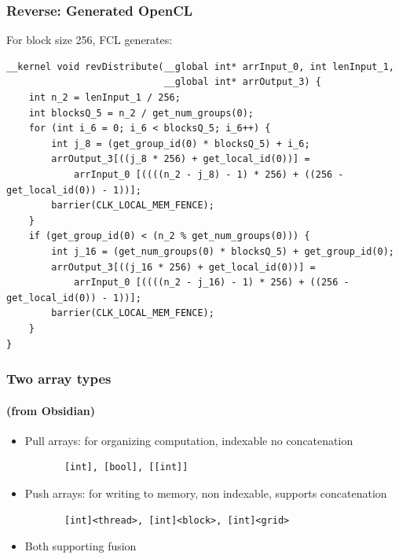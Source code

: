 \documentclass{beamer}
\begin{document}
\begin{frame}[fragile]
\end{frame}

\begin{frame}[fragile]
  \frametitle{Reverse: Generated OpenCL}
For block size 256, FCL generates:

{\tiny
  \begin{verbatim}
__kernel void revDistribute(__global int* arrInput_0, int lenInput_1,
                            __global int* arrOutput_3) {
    int n_2 = lenInput_1 / 256;
    int blocksQ_5 = n_2 / get_num_groups(0);
    for (int i_6 = 0; i_6 < blocksQ_5; i_6++) {
        int j_8 = (get_group_id(0) * blocksQ_5) + i_6;
        arrOutput_3[((j_8 * 256) + get_local_id(0))] = 
            arrInput_0 [((((n_2 - j_8) - 1) * 256) + ((256 - get_local_id(0)) - 1))];
        barrier(CLK_LOCAL_MEM_FENCE);
    }
    if (get_group_id(0) < (n_2 % get_num_groups(0))) {
        int j_16 = (get_num_groups(0) * blocksQ_5) + get_group_id(0);
        arrOutput_3[((j_16 * 256) + get_local_id(0))] = 
            arrInput_0 [((((n_2 - j_16) - 1) * 256) + ((256 - get_local_id(0)) - 1))];
        barrier(CLK_LOCAL_MEM_FENCE);
    }
}
\end{verbatim}
}
\end{frame}

\begin{frame}
  \frametitle{Two array types}
  \framesubtitle{(from Obsidian)}

  \begin{itemize}
  \item Pull arrays: for organizing computation, indexable no concatenation
    \begin{verbatim}
       [int], [bool], [[int]]\end{verbatim}
  \item Push arrays: for writing to memory, non indexable, supports concatenation
    \begin{verbatim}
       [int]<thread>, [int]<block>, [int]<grid>\end{verbatim}
   \item Both supporting fusion
  \end{itemize}  
\end{frame}
\end{document}
